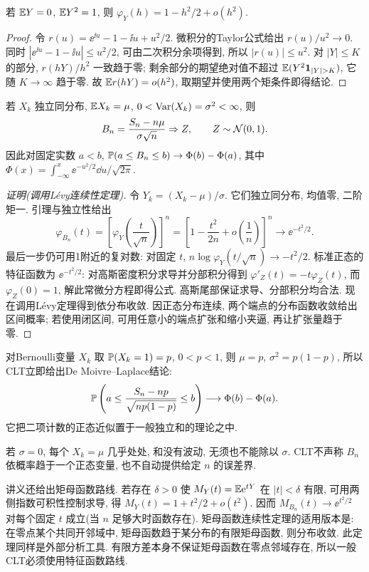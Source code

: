\begin{lemma}[有限二阶矩的展开]
若 $\mathbb E Y=0$, $\mathbb E Y^2=1$, 则 $\varphi_Y(h)=1-h^2/2+o(h^2)$.
\end{lemma}
\begin{proof}
令 $r(u)=\ee^{\ii u}-1-\ii u+u^2/2$. 微积分的Taylor公式给出 $r(u)/u^2\to0$. 同时
$|\ee^{\ii u}-1-\ii u|\leq u^2/2$, 可由二次积分余项得到, 所以 $|r(u)|\leq u^2$. 对 $|Y|\leq K$ 的部分, $r(hY)/h^2$ 一致趋于零; 剩余部分的期望绝对值不超过 $\E(Y^2\ind_{|Y|>K})$, 它随 $K\to\infty$ 趋于零. 故 $\mathbb E r(hY)=o(h^2)$, 取期望并使用两个矩条件即得结论.
\end{proof}
\begin{theorem}[独立同分布中心极限定理]
若 $X_k$ 独立同分布, $\mathbb E X_k=\mu$, $0<\operatorname{Var}(X_k)=\sigma^2<\infty$, 则
\[B_n=\frac{S_n-n\mu}{\sigma\sqrt n}\Rightarrow Z,\qquad Z\sim\mathcal N(0,1).\]
因此对固定实数 $a<b$, $\mathbb P(a\leq B_n\leq b)\to\Phi(b)-\Phi(a)$, 其中 $\Phi(x)=\int_{-\infty}^x\ee^{-u^2/2}\dd u/\sqrt{2\pi}$.
\end{theorem}
\begin{proof}[证明(调用L\'evy连续性定理)]
令 $Y_k=(X_k-\mu)/\sigma$. 它们独立同分布, 均值零, 二阶矩一. 引理与独立性给出
\[\varphi_{B_n}(t)=\left[\varphi_Y\left(\frac{t}{\sqrt n}\right)\right]^n
=\left[1-\frac{t^2}{2n}+o\left(\frac1n\right)\right]^n\to\ee^{-t^2/2}.\]
最后一步仍可用1附近的复对数: 对固定 $t$, $n\log\varphi_Y(t/\sqrt n)\to-t^2/2$. 标准正态的特征函数为 $\ee^{-t^2/2}$: 对高斯密度积分求导并分部积分得到 $\varphi'_Z(t)=-t\varphi_Z(t)$, 而 $\varphi_Z(0)=1$, 解此常微分方程即得公式. 高斯尾部保证求导、分部积分均合法. 现在调用L\'evy定理得到依分布收敛. 因正态分布连续, 两个端点的分布函数收敛给出区间概率; 若使用闭区间, 可用任意小的端点扩张和缩小夹逼, 再让扩张量趋于零.
\end{proof}
对Bernoulli变量 $X_k$ 取 $\mathbb P(X_k=1)=p$, $0<p<1$, 则 $\mu=p$, $\sigma^2=p(1-p)$, 所以CLT立即给出De Moivre--Laplace结论:
\[\mathbb P\left(a\leq\frac{S_n-np}{\sqrt{np(1-p)}}\leq b\right)\longrightarrow\Phi(b)-\Phi(a).\]
它把二项计数的正态近似置于一般独立和的理论之中.

若 $\sigma=0$, 每个 $X_k=\mu$ 几乎处处, 和没有波动, 无须也不能除以 $\sigma$. CLT不声称 $B_n$ 依概率趋于一个正态变量, 也不自动提供给定 $n$ 的误差界.

讲义还给出矩母函数路线. 若存在 $\delta>0$ 使 $M_Y(t)=\mathbb E\mathrm e^{tY}$ 在 $|t|<\delta$ 有限, 可用两侧指数可积性控制求导, 得 $M_Y(t)=1+t^2/2+o(t^2)$. 因而 $M_{B_n}(t)\to\ee^{t^2/2}$ 对每个固定 $t$ 成立(当 $n$ 足够大时函数存在). 矩母函数连续性定理的适用版本是: 在零点某个共同开邻域中, 矩母函数趋于某分布的有限矩母函数, 则分布收敛. 此定理同样是外部分析工具. 有限方差本身不保证矩母函数在零点邻域存在, 所以一般CLT必须使用特征函数路线.

